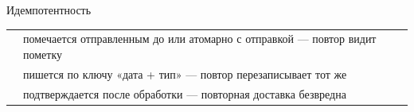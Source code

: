 \documentclass[aspectratio=169,10pt,t]{beamer}
\begin{document}
\begin{frame}{Идемпотентность}
  \slidetop

  {\renewcommand{\arraystretch}{1.6}
  \begin{tabular}{@{}L{3.2cm}L{9.6cm}@{}}
          & помечается отправленным до или атомарно с отправкой
      --- повтор видит пометку \\
         & пишется по ключу «дата + тип» --- повтор
      перезаписывает тот же \\
     & подтверждается после обработки --- повторная доставка
      безвредна \\
  \end{tabular}}

  \slidegap
\end{frame}

\begin{frame}[plain]
\end{frame}
\end{document}
